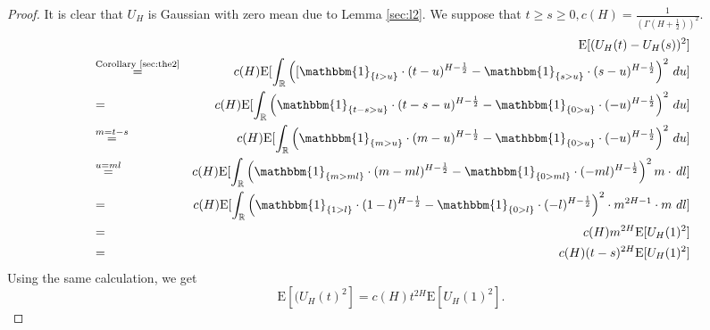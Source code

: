 \documentclass[a4paper, twoside, 11pt]{article}
\theoremstyle{definition}
\newcommand{\brkt}[1]{\left({#1} \right)}
\begin{document}
  \begin{proof}
	It is clear that $U_H$ is Gaussian with zero mean due to Lemma \ref{sec:l2}. We suppose that $t \ge s \ge 0,  c(H)=\frac{1}{(\Gamma(H+\frac{1}{2}))^2}$.
	\begin{eqnarray}
	  &&\mathrm{E}[(U_H(t) - U_H(s))^2]\nonumber\\
	  &\overset{\text{Corollary \ref{sec:the2}}}{=}& c(H)\mathrm{E}[\int_{\mathbb{R}} \brkt{[\mathbbm{1}_{\{t > u\}}\cdot(t-u)^{H-\frac{1}{2}}  - \mathbbm{1}_{\{s > u\}}\cdot(s-u)^{H-\frac{1}{2}}}^2 \,\mathop{du}]\nonumber\\
	  &=& c(H)\mathrm{E}[\int_{\mathbb{R}} \brkt{\mathbbm{1}_{\{t-s > u\}}\cdot(t-s-u)^{H-\frac{1}{2}}  - \mathbbm{1}_{\{0 > u\}}\cdot(-u)^{H-\frac{1}{2}}}^2 \,\mathop{du}]\nonumber\\
	  &\overset{m=t-s}{=}& c(H)\mathrm{E}[\int_{\mathbb{R}} \brkt{\mathbbm{1}_{\{m > u\}}\cdot(m-u)^{H-\frac{1}{2}}  - \mathbbm{1}_{\{0 > u\}}\cdot(-u)^{H-\frac{1}{2}}}^2 \,\mathop{du}]\nonumber\\
	  &\overset{u=ml}{=}& c(H)\mathrm{E}[\int_{\mathbb{R}} \brkt{\mathbbm{1}_{\{m > ml\}}\cdot(m-ml)^{H-\frac{1}{2}}  - \mathbbm{1}_{\{0 > ml\}}\cdot(-ml)^{H-\frac{1}{2}}}^2 m\cdot\,\mathop{dl}]\nonumber\\
	  &=& c(H)\mathrm{E}[\int_{\mathbb{R}} \brkt{\mathbbm{1}_{\{1 > l \}}\cdot(1-l)^{H-\frac{1}{2}}  - \mathbbm{1}_{\{0 > l\}}\cdot(-l)^{H-\frac{1}{2}}}^2 \cdot m^{2H-1}\cdot m\,\mathop{dl}]\nonumber\\
	  &=& c(H)m^{2H}\mathrm{E}[U_H(1)^2]\nonumber\\
	  &=& c(H)(t-s)^{2H}\mathrm{E}[U_H(1)^2]
	  \label{sec:eqn1}
	\end{eqnarray}
	Using the same calculation, we get
	\begin{equation}
	  \mathrm{E}[(U_H(t)^2] = c(H)t^{2H}\mathrm{E}[U_H(1)^2].
	  \label{sec:eqn2}
	\end{equation}


\end{proof}
\end{document}
